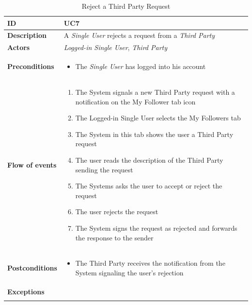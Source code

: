 \documentclass[titlepage]{article}
\begin{document}
\begin{longtable}{| p{3 cm} | p{10 cm} |} 
			\hline
			{\bf ID} & UC7 \\
			\hline
			{\bf Description} & A {\it Single User} rejects a request from a {\it Third Party}\\
			\hline
			{\bf Actors} & {\it Logged-in Single User}, {\it Third Party} \\
			\hline
			{\bf Preconditions} & 		
							\begin{itemize}
								\item The {\it Single User}  has  logged into his account 
							\end{itemize}
			\\
			\hline
			{\bf Flow of events} & 
							\begin{enumerate}
								\item The System signals a new Third Party request with a notification on the My Follower tab icon
\item The Logged-in Single User selects the My Followers tab
\item The System  in this tab shows the user a Third Party request
\item The user reads the description of the Third Party sending the request
\item The Systems asks the user to accept or reject the request
\item The user rejects the request
\item The System signs the request as rejected and forwards the response to the sender
							\end{enumerate}
			
			 \\
			\hline
			{\bf Postconditions} & 
							\begin{itemize}
								\item The Third Party receives the notification from the System signaling the user’s rejection

							\end{itemize}
			\\
			\hline
			{\bf Exceptions} & 
							
			\\
			\hline
			\caption{Reject a Third Party Request}
			\end{longtable}

\end{document}

